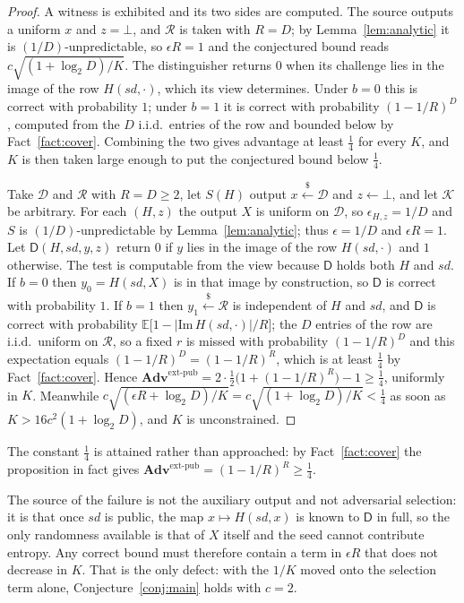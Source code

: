 \documentclass{aicr-solution}
\newcommand{\Adv}{\mathbf{Adv}}
\newcommand{\extp}{\mathrm{ext}\text{-}\mathrm{pub}}
\newcommand{\sd}{\mathit{sd}}
\renewcommand{\sample}{\stackrel{{\scriptscriptstyle\$}}{\leftarrow}}
\newcommand{\calK}{\mathcal{K}}
\newcommand{\calD}{\mathcal{D}}
\newcommand{\calR}{\mathcal{R}}
\begin{document}
\begin{proof}
A witness is exhibited and its two sides are computed. The source outputs a uniform $x$ and
$z = \bot$, and $\calR$ is taken with $R = D$; by Lemma~\ref{lem:analytic} it is
$(1/D)$-unpredictable, so $\epsilon R = 1$ and the conjectured bound reads
$c\sqrt{(1+\log_2 D)/K}$. The distinguisher returns $0$ when its challenge lies in the image of the
row $H(\sd,\cdot)$, which its view determines. Under $b = 0$ this is correct with probability $1$;
under $b = 1$ it is correct with probability $(1-1/R)^{D}$, computed from the $D$ i.i.d.\ entries
of the row and bounded below by Fact~\ref{fact:cover}. Combining the two gives advantage at least $\tfrac14$ for every $K$, and $K$ is then
taken large enough to put the conjectured bound below $\tfrac14$.

Take $\calD$ and $\calR$ with $R = D \ge 2$, let $S(H)$ output $x \sample \calD$ and
$z \leftarrow \bot$, and let $\calK$ be arbitrary. For each $(H,z)$ the output $X$ is uniform on
$\calD$, so $\epsilon_{H,z} = 1/D$ and $S$ is $(1/D)$-unpredictable by
Lemma~\ref{lem:analytic}; thus $\epsilon = 1/D$ and $\epsilon R = 1$. Let $\mathsf{D}(H,\sd,y,z)$
return $0$ if $y$ lies in the image of the row $H(\sd,\cdot)$ and $1$ otherwise. The test is
computable from the view because $\mathsf{D}$ holds both $H$ and $\sd$. If $b = 0$ then
$y_0 = H(\sd,X)$ is in that image by construction, so $\mathsf{D}$ is correct with probability $1$.
If $b = 1$ then $y_1 \sample \calR$ is independent of $H$ and $\sd$, and $\mathsf{D}$ is correct
with probability $\mathbb{E}\bigl[1 - |\mathrm{Im}\,H(\sd,\cdot)|/R\bigr]$; the $D$ entries of the
row are i.i.d.\ uniform on $\calR$, so a fixed $r$ is missed with probability $(1-1/R)^{D}$ and this
expectation equals $(1-1/R)^{D} = (1-1/R)^{R}$, which is at least $\tfrac14$ by
Fact~\ref{fact:cover}. Hence
$\Adv^{\extp} = 2 \cdot \tfrac12\bigl(1 + (1-1/R)^{R}\bigr) - 1 \ge \tfrac14$, uniformly in $K$.
Meanwhile $c\sqrt{(\epsilon R + \log_2 D)/K} = c\sqrt{(1+\log_2 D)/K} < \tfrac14$ as soon as
$K > 16c^{2}(1 + \log_2 D)$, and $K$ is unconstrained.
\end{proof}

The constant $\tfrac14$ is attained rather than approached: by Fact~\ref{fact:cover} the
proposition in fact gives
$\Adv^{\extp} = (1-1/R)^{R} \ge \tfrac14$.

The source of the failure is not the auxiliary output and not adversarial selection: it is that
once $\sd$ is public, the map $x \mapsto H(\sd,x)$ is known to $\mathsf{D}$ in full, so the only
randomness available is that of $X$ itself and the seed cannot contribute entropy. Any correct
bound must therefore contain a term in $\epsilon R$ that does not decrease in $K$. That is the
only defect: with the $1/K$ moved onto the selection term alone, Conjecture~\ref{conj:main} holds
with $c = 2$.
\end{document}

